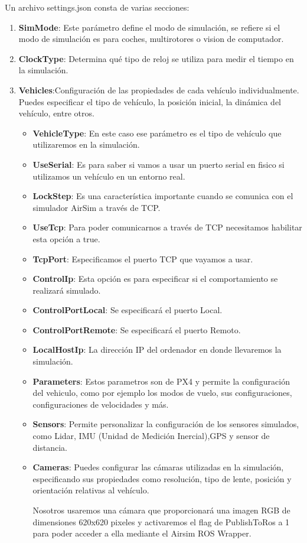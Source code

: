 Un archivo settings.json consta de varias secciones: 
\begin{enumerate}
  \item \textbf{SimMode}: Este parámetro define el modo de simulación, se refiere si el modo de simulación es para coches, multirotores o vision de computador.
  \item \textbf{ClockType}: Determina qué tipo de reloj se utiliza para medir el tiempo en la simulación. 
  \item \textbf{Vehicles}:Configuración de  las propiedades de cada vehículo individualmente. Puedes especificar el tipo de vehículo, la posición inicial, la dinámica del vehículo, entre otros.
  \begin{itemize}
    \item \textbf{VehicleType}: En este caso ese parámetro es el tipo de vehículo que utilizaremos en la simulación.
    \item \textbf{UseSerial}: Es para saber si vamos a usar un puerto serial en fisico si utilizamos un vehículo en un entorno real.
    \item \textbf{LockStep}: Es una característica importante cuando se comunica con el simulador AirSim a través de TCP.
    \item \textbf{UseTcp}: Para poder comunicarnos a través de TCP necesitamos habilitar esta opción a true.
    \item \textbf{TcpPort}: Especificamos el puerto TCP que vayamos a usar. 
    \item \textbf{ControlIp}: Esta opción es para especificar si el comportamiento se realizará simulado.
    \item \textbf{ControlPortLocal}: Se especificará el puerto Local. 
    \item \textbf{ControlPortRemote}: Se especificará el puerto Remoto.
    \item \textbf{LocalHostIp}: La dirección IP del ordenador en donde llevaremos la simulación.
    \item \textbf{Parameters}: Estos parametros son de PX4 y permite la configuración del vehiculo,
    como por ejemplo los modos de vuelo, sus configuraciones, configuraciones de velocidades y más. 
    \item \textbf{Sensors}: Permite personalizar la configuración de los sensores simulados, como Lidar, IMU (Unidad de Medición Inercial),GPS y sensor de distancia. 
    \item \textbf{Cameras}: Puedes configurar las cámaras utilizadas en la simulación, especificando sus propiedades como resolución, tipo de lente, posición y orientación relativas al vehículo.\newline 
    
    Nosotros usaremos una cámara que proporcionará una imagen RGB de dimensiones 620x620 pixeles y activaremos
    el flag de PublishToRos a 1 para poder acceder a ella mediante el Airsim ROS Wrapper.
  \end{itemize}
\end{enumerate}


